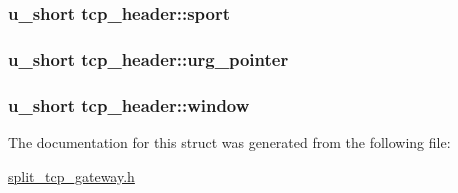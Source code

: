 \hypertarget{structtcp__header_a36d1e56a05521e48f27b290522734462}{
\subsubsection[{sport}]{\setlength{\rightskip}{0pt plus 5cm}u\-\_\-short {\bf tcp\-\_\-header\-::sport}}}\label{structtcp__header_a36d1e56a05521e48f27b290522734462}
\hypertarget{structtcp__header_a8ca2bf27396ec84f7a08c4c3ac41cba1}{
\subsubsection[{urg\-\_\-pointer}]{\setlength{\rightskip}{0pt plus 5cm}u\-\_\-short {\bf tcp\-\_\-header\-::urg\-\_\-pointer}}}\label{structtcp__header_a8ca2bf27396ec84f7a08c4c3ac41cba1}
\hypertarget{structtcp__header_a0b1bdce92d75ab4e05309ae6b666a6b2}{
\subsubsection[{window}]{\setlength{\rightskip}{0pt plus 5cm}u\-\_\-short {\bf tcp\-\_\-header\-::window}}}\label{structtcp__header_a0b1bdce92d75ab4e05309ae6b666a6b2}


\-The documentation for this struct was generated from the following file\-:\begin{DoxyCompactItemize}
\item 
\hyperlink{split__tcp__gateway_8h}{split\-\_\-tcp\-\_\-gateway.\-h}\end{DoxyCompactItemize}
